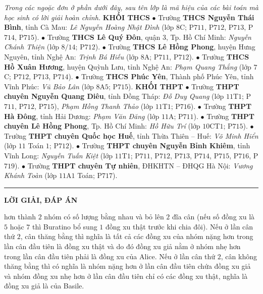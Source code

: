 \begin{multicols}{2}
	\textit{Trong các ngoặc đơn ở phần dưới đây, sau tên lớp là mã hiệu của các bài toán mà học sinh có lời giải hoàn chỉnh.}
	\vskip 0.1cm
	\textbf{\color{thachthuctoanhoc}KHỐI THCS}
	\vskip 0.05cm
	$\bullet$  Trường \textbf{\color{thachthuctoanhoc}THCS Nguyễn Thái Bình}, tỉnh Cà Mau: \textit{Lê Nguyễn Hoàng Nhật Đình} (lớp $8$C; P$711$, P$712$, P$713$, P$714$, P$715$).
	\vskip 0.05cm
	$\bullet$  Trường \textbf{\color{thachthuctoanhoc}THCS Lê Quý Đôn}, quận $3$, Tp. Hồ Chí Minh: \textit{Nguyễn Chánh Thiện} (lớp $8/14$; P$712$).
	\vskip 0.05cm
	$\bullet$  Trường \textbf{\color{thachthuctoanhoc}THCS Lê Hồng Phong}, huyện Hưng Nguyên, tỉnh Nghệ An: \textit{Trịnh Bá Hiếu} (lớp $8$A; P$711$, P$712$).
	\vskip 0.05cm
	$\bullet$  Trường \textbf{\color{thachthuctoanhoc}THCS Hồ Xuân Hương}, huyện Quỳnh Lưu, tỉnh Nghệ An: \textit{Phạm Quang Thắng} (lớp $7$C; P$712$, P$713$, P$714$).
	\vskip 0.05cm
	$\bullet$  Trường \textbf{\color{thachthuctoanhoc}THCS Phúc Yên}, Thành phố Phúc Yên, tỉnh Vĩnh Phúc: \textit{Vũ Bảo Lân} (lớp $8$A$5$; P$715$).
	\vskip 0.05cm
	\textbf{\color{thachthuctoanhoc}KHỐI THPT}
	\vskip 0.05cm
	$\bullet$  Trường \textbf{\color{thachthuctoanhoc}THPT chuyên Nguyễn Quang Diêu}, tỉnh Đồng Tháp: \textit{Đỗ Duy Quang} (lớp $11$T$1$; P$711$, P$712$, P$715$), \textit{Phạm Hồng Thanh Thảo} (lớp $11$T$1$; P$716$).
	\vskip 0.05cm
	$\bullet$  Trường \textbf{\color{thachthuctoanhoc}THPT Hà Đông}, tỉnh Hải Dương: \textit{Phạm Văn Đăng} (lớp $11$A; P$711$).
	\vskip 0.05cm
	$\bullet$  Trường \textbf{\color{thachthuctoanhoc}THPT chuyên Lê Hồng Phong}, Tp. Hồ Chí Minh: \textit{Hồ Hữu Trí} (lớp $10$CT$1$; P$715$).
	\vskip 0.05cm
	$\bullet$  Trường \textbf{\color{thachthuctoanhoc}THPT chuyên Quốc học Huế}, tỉnh Thừa Thiên -- Huế: \textit{Võ Minh Hiển} (lớp $11$ Toán $1$; P$712$).
	\vskip 0.05cm
	$\bullet$  Trường \textbf{\color{thachthuctoanhoc}THPT chuyên Nguyễn Bỉnh Khiêm}, tỉnh Vĩnh Long: \textit{Nguyễn Tuấn Kiệt} (lớp $11$T$1$; P$711$, P$712$, P$713$, P$714$, P$715$, P$716$, P$719$).
	\vskip 0.05cm
	$\bullet$  Trường \textbf{\color{thachthuctoanhoc}THPT chuyên Tự nhiên}, ĐHKHTN -- ĐHQG Hà Nội: \textit{Vương Khánh Toàn} (lớp $11$A$1$ Toán; P$717$).
\end{multicols}
\vspace*{-10pt}
{\color{thachthuctoanhoc}\rule{1\linewidth}{1pt}}
\vskip 0.2cm
\centerline{\Large{\textbf{\color{thachthuctoanhoc}LỜI GIẢI, ĐÁP ÁN}}}
\vskip 0.1cm
\begin{multicols}{2}
	hơn thành $2$ nhóm có số lượng bằng nhau và bỏ lên $2$ đĩa cân (nếu số đồng xu là $5$ hoặc $7$ thì Buratino bổ sung $1$ đồng xu thật trước khi chia đôi). Nếu ở lần cân thứ $2$, cân thăng bằng thì nghĩa là tất cả các đồng xu của nhóm nặng hơn trong lần cân đầu tiên là đồng xu thật và do đó đồng xu giả nằm ở nhóm nhẹ hơn trong lần cân đầu tiên phải là đồng xu của Alice. Nếu ở lần cân thứ $2$, cân không thăng bằng thì có nghĩa là nhóm nặng hơn ở lần cân đầu tiên chứa đồng xu giả và nhóm đồng xu nhẹ hơn ở lần cân đầu tiên chỉ có các đồng xu thật, nghĩa là đồng xu giả là của Basile.
\end{multicols}

